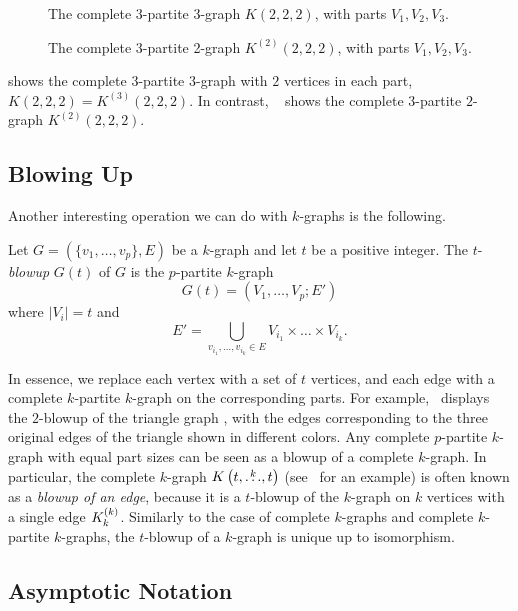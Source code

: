 \begin{figure}[htbp]
    \centering
    
    \caption{The complete 3-partite 3-graph $K(2, 2, 2)$, with parts $V_1, V_2, V_3$.}
    \label{fig:222}
\end{figure}

\begin{figure}[htbp]
    \centering
    
    \caption{The complete 3-partite 2-graph $K^{(2)}(2, 2, 2)$, with parts $V_1, V_2, V_3$.}
    \label{fig:k2_222}
\end{figure}

 shows the complete $3$-partite $3$-graph
with $2$ vertices in each part, $K(2, 2, 2) = K^{(3)}(2, 2, 2)$.
In contrast, ~ shows the complete $3$-partite $2$-graph
$K^{(2)}(2, 2, 2)$.

\subsection{Blowing Up} \label{subsec:blowup}
Another interesting operation we can do with $k$-graphs is the following.

\begin{definition}
    Let $G = (\{v_1, \dots, v_p\}, E)$ be a $k$-graph and let $t$ be a positive integer.
    The $t$-\emph{blowup} $G(t)$ of $G$ is the $p$-partite $k$-graph
    \[
        G(t) = (V_1, \dots, V_p; E')
    \]
    where $|V_i| = t$ and
    \[
        E' = \bigcup_{v_{i_1}, \dots, v_{i_k} \in E} V_{i_1} \times \dots \times V_{i_k}.
    \]
\end{definition}

In essence, we replace each vertex with a set of $t$ vertices, and each edge with a complete $k$-partite $k$-graph
on the corresponding parts.
For example,~ displays the $2$-blowup of the triangle graph ,
with the edges corresponding to the three original edges of the triangle shown in different colors.
Any complete $p$-partite $k$-graph with equal part sizes can be seen as a blowup of a complete $k$-graph.
In particular, the complete $k$-graph $K\left(t, \overset{k}{\dots}, t\right)$ (see~ for an example)
is often known as a \emph{blowup of an edge}, because it is a $t$-blowup of the
$k$-graph on $k$ vertices with a single edge $K^{(k)}_{k}$.
Similarly to the case of complete $k$-graphs and complete $k$-partite $k$-graphs,
the $t$-blowup of a $k$-graph is unique up to isomorphism.

\subsection{Asymptotic Notation}\label{subsec:asymptotic-notation} %

